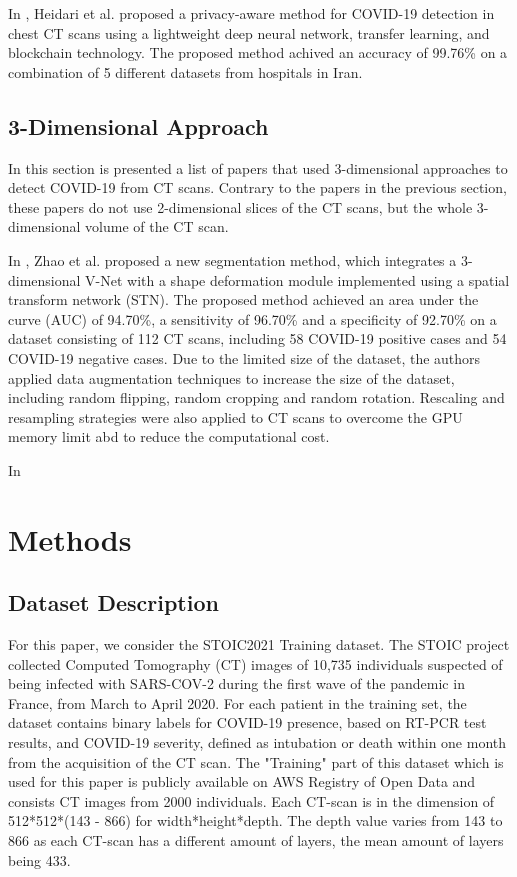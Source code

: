 \documentclass[12pt, letterpaper]{article}
\begin{document}
In \cite{Heidari_2022}, Heidari et al. proposed a privacy-aware method for COVID-19 detection in chest CT scans using a lightweight deep neural network, transfer learning, and blockchain technology. The proposed method achived an accuracy of 99.76\% on a combination of 5 different datasets from hospitals in Iran.

\subsection{3-Dimensional Approach}
In this section is presented a list of papers that used 3-dimensional approaches to detect COVID-19 from CT scans. Contrary to the papers in the previous section, these papers do not use 2-dimensional slices of the CT scans, but the whole 3-dimensional volume of the CT scan. 

In \cite{Zhao_2021}, Zhao et al. proposed a new segmentation method, which integrates a 3-dimensional V-Net with a shape deformation module implemented using a spatial transform network (STN). The proposed method achieved an area under the curve (AUC) of 94.70\%, a sensitivity of 96.70\% and a specificity of 92.70\% on a dataset consisting of 112 CT scans, including 58 COVID-19 positive cases and 54 COVID-19 negative cases. Due to the limited size of the dataset, the authors applied data augmentation techniques to increase the size of the dataset, including random flipping, random cropping and random rotation. Rescaling and resampling strategies were also applied to CT scans to overcome the GPU memory limit abd to reduce the computational cost.

In \cite{Pu_2020}

\newpage
\section{Methods}

\subsection{Dataset Description}
For this paper, we consider the STOIC2021 Training dataset. The STOIC project collected Computed Tomography (CT) images of 10,735 individuals suspected of being infected with SARS-COV-2 during the first wave of the pandemic in France, from March to April 2020. For each patient in the training set, the dataset contains binary labels for COVID-19 presence, based on RT-PCR test results, and COVID-19 severity, defined as intubation or death within one month from the acquisition of the CT scan\cite{Revel_2021}. The "Training" part of this dataset which is used for this paper is publicly available on AWS Registry of Open Data \cite{STOIC_Training} and consists CT images from 2000 individuals. Each CT-scan is in the dimension of 512*512*(143 - 866) for width*height*depth. The depth value varies from 143 to 866 as each CT-scan has a different amount of layers, the mean amount of layers being 433.
\end{document}
